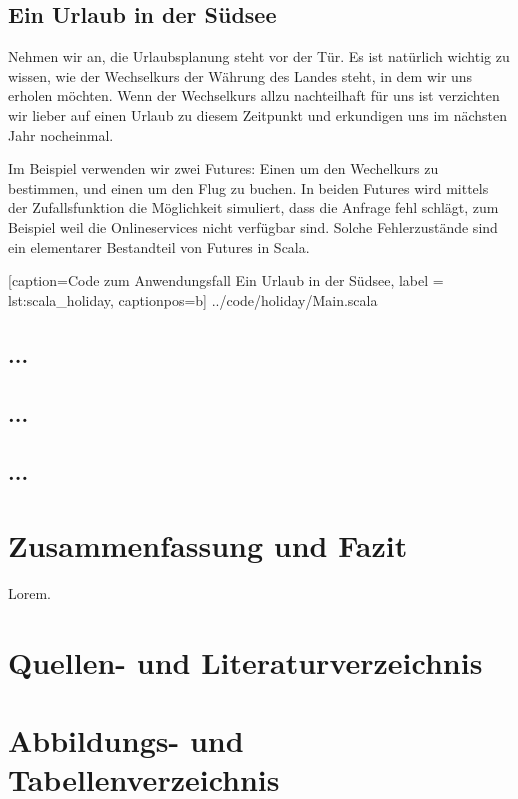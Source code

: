 \documentclass[11pt,a4paper,titlepage,ngerman]{scrartcl}
\begin{document}
\subsection{Ein Urlaub in der Südsee}

Nehmen wir an, die Urlaubsplanung steht vor der Tür. Es ist natürlich wichtig
zu wissen, wie der Wechselkurs der Währung des Landes steht, in dem wir uns
erholen möchten. Wenn der Wechselkurs allzu nachteilhaft für uns ist
verzichten wir lieber auf einen Urlaub zu diesem Zeitpunkt und erkundigen
uns im nächsten Jahr nocheinmal.

Im Beispiel verwenden wir zwei Futures: Einen um den Wechelkurs zu bestimmen,
und einen um den Flug zu buchen. In beiden Futures wird mittels der Zufallsfunktion
die Möglichkeit simuliert, dass die Anfrage fehl schlägt, zum Beispiel weil
die Onlineservices nicht verfügbar sind. Solche Fehlerzustände sind ein elementarer
Bestandteil von Futures in Scala.


    [caption={Code zum Anwendungsfall \glqq Ein Urlaub in der Südsee\grqq },
       label = lst:scala_holiday,
       captionpos=b]
 {../code/holiday/Main.scala}
 

\subsection{...}
\subsection{...}
\subsection{...}

\newpage
\section{Zusammenfassung und Fazit}

Lorem.

\newpage

\section{Quellen- und Literaturverzeichnis}




\section{Abbildungs- und Tabellenverzeichnis}

\renewcommand{\listfigurename}{Verzeichnis der Abbildungen}
\listoffigures

\newpage

\printglossary
\end{document}
